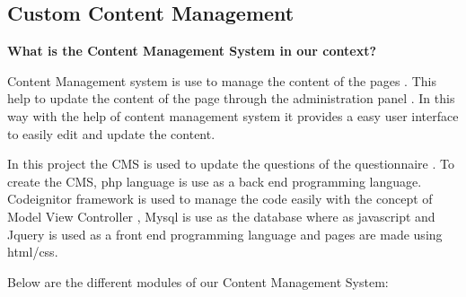 \subsection{Custom Content Management}
\textbf{What is the Content Management System in our context?}
\par Content Management system is use to manage the content of the pages . This help to update the content of the page through the administration panel . In this way with the help of content management system it provides a easy user interface to easily edit and update the content.
\par In this project the CMS is used to update the questions of the questionnaire . To create the CMS, php language is use as a back end programming language.  Codeignitor\cite{CodeIgniter} framework is used to manage the code easily with the concept of Model View Controller , Mysql is use as the database where as javascript and Jquery is used as a front end programming language and pages are made using html/css.
\par Below are the different modules of our Content Management System:

